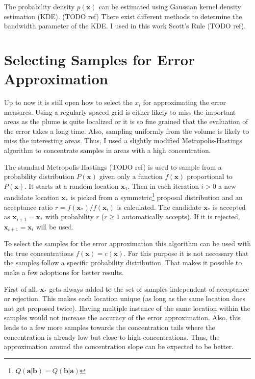 \documentclass[11pt,a4paper]{scrreprt}
\newcommand{\vc}[1]{\bm{#1}}
\begin{document}
The probability density $p(\vc x)$ can be estimated using Gaussian kernel 
density estimation (KDE). (TODO ref) There exist different methods to determine 
the bandwidth parameter of the KDE\@. I used in this work Scott's Rule (TODO 
ref).

\section{Selecting Samples for Error Approximation}
Up to now it is still open how to select the $x_i$ for approximating the error 
measures.  Using a regularly spaced grid is either likely to miss the important 
areas as the plume is quite localized or it is so fine grained that the 
evaluation of the error takes a long time. Also, sampling uniformly from the 
volume is likely to miss the interesting areas.  Thus, I used a slightly 
modified Metropolis-Hastings algorithm to concentrate samples in areas with 
a high concentration.

The standard Metropolis-Hastings (TODO ref) is used to sample from a probability 
distribution $P(\vc x)$ given only a function $f(\vc x)$ proportional to $P(\vc 
x)$. It starts at a random location $\vc x_1$.  Then in each iteration $i > 0$ 
a new candidate location $\vc x_*$ is picked from a symmetric\footnote{$Q(\vc 
    a | \vc b) = Q(\vc b | \vc a)$} proposal distribution and an acceptance 
ratio $r = f(\vc x_*) / f(\vc x_i)$ is calculated. The candidate $\vc x_*$ is 
accepted as $\vc x_{i + 1} = \vc x_*$ with probability $r$ ($r \geq 1$ 
automatically accepts). If it is rejected, $\vc x_{i + 1} = \vc x_i$ will be 
used.

To select the samples for the error approximation this algorithm can be used 
with the true concentrations $f(\vc x) = c(\vc x)$. For this purpose it is not 
necessary that the samples follow a specific probability distribution. That 
makes it possible to make a few adoptions for better results.

First of all, $\vc x_*$ gets always added to the set of samples independent of 
acceptance or rejection.  This makes each location unique (as long as the same 
location does not get proposed twice).  Having multiple instance of the same 
location within the samples would not increase the accuracy of the error 
approximation. Also, this leads to a few more samples towards the concentration 
tails where the concentration is already low but close to high concentrations.  
Thus, the approximation around the concentration slope can be expected to be 
better.
\end{document}
